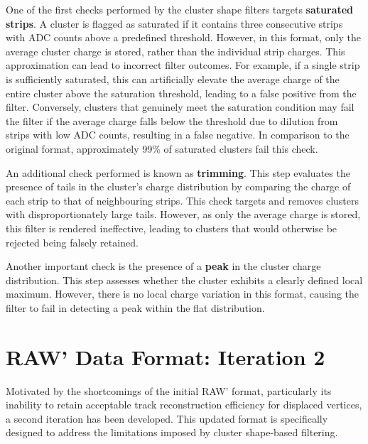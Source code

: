 One of the first checks performed by the cluster shape filters targets \textbf{saturated strips}. A cluster is flagged as saturated if it contains three consecutive strips with ADC counts above a predefined threshold. However, in this format, only the average cluster charge is stored, rather than the individual strip charges. This approximation can lead to incorrect filter outcomes. For example, if a single strip is sufficiently saturated, this can artificially elevate the average charge of the entire cluster above the saturation threshold, leading to a false positive from the filter. Conversely, clusters that genuinely meet the saturation condition may fail the filter if the average charge falls below the threshold due to dilution from strips with low ADC counts, resulting in a false negative. In comparison to the original format, approximately 99\% of saturated clusters fail this check.

An additional check performed is known as \textbf{trimming}. This step evaluates the presence of tails in the cluster's charge distribution by comparing the charge of each strip to that of neighbouring strips.  This check targets and removes clusters with disproportionately large tails. However, as only the average charge is stored, this filter is rendered ineffective, leading to clusters that would otherwise be rejected being falsely retained. 

Another important check is the presence of a \textbf{peak} in the cluster charge distribution. This step assesses whether the cluster exhibits a clearly defined local maximum. However, there is no local charge variation in this format, causing the filter to fail in detecting a peak within the flat distribution.

\section{RAW' Data Format: Iteration 2}

Motivated by the shortcomings of the initial RAW' format, particularly its inability to retain acceptable track reconstruction efficiency for displaced vertices, a second iteration has been developed. This updated format is specifically designed to address the limitations imposed by cluster shape-based filtering.

